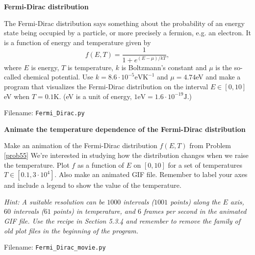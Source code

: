 \begin{Problem}{\textbf{Fermi-Dirac distribution}} \label{prob55}

\noindent The Fermi-Dirac distribution says something about the probability of an energy
state being occupied by a particle, or more precisely a fermion, e.g. an electron.
It is a function of energy and temperature given by
\begin{equation}
f(E, T) = \frac{1}{1 + e^{(E - \mu)/kT}},
\end{equation}
where $E$ is energy, $T$ is temperature, $k$ is Boltzmann's constant and $\mu$ is
the so-called chemical potential. Use $k = 8.6 \cdot 10^{-5}\mathrm{eVK^{-1}}$ and
$\mu = 4.74$eV and make a program that visualizes the Fermi-Dirac distribution on
the interval $E \in [0, 10]$eV when $T = 0.1$K. (eV is a unit of energy, $1\mathrm{eV}
= 1.6\cdot 10^{-19}\mathrm{J}$.)

Filename: \texttt{Fermi\_Dirac.py}
\end{Problem}

\begin{Problem}{\textbf{Animate the temperature dependence of the Fermi-Dirac distribution}}

\noindent Make an animation of the Fermi-Dirac distribution $f(E, T)$ from Problem \ref{prob55}
We're interested in studying how the distribution changes when we raise the temperature.
Plot $f$ as a function of $E$ on $[0, 10]$ for a set of temperatures
$T \in [0.1, 3 \cdot 10^{4}]$. Also make an animated GIF file. Remember
to label your axes and include a legend to show the value of the temperature.

\emph{Hint: A suitable resolution can be $1 000$ intervals ($1 001$ points) along
the $E$ axis,  $60$ intervals ($61$ points) in temperature, and $6$ frames per
second in the animated GIF file. Use the recipe in Section 5.3.4 and remember to
remove the family of old plot files in the beginning of the program.} 

Filename: \texttt{Fermi\_Dirac\_movie.py}
\end{Problem}


